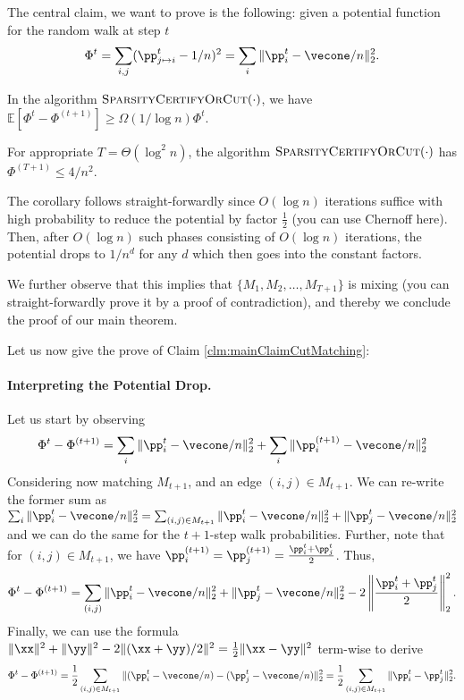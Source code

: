 The central claim, we want to prove is the following: given a potential function for the random walk at step $t$
\[
    \Phi^t = \sum_{i,j} (\pp_{j \mapsto i}^t - 1/n)^2 = \sum_{i} \|\pp_{i}^t - \vecone/n\|_2^2.
\]
\begin{claim}\label{clm:mainClaimCutMatching}
In the algorithm $\textsc{SparsityCertifyOrCut}(\cdot)$, we have $\mathbb{E}[\Phi^{t} - \Phi^{(t+1)}] \geq \Omega(1/\log n) \Phi^{t}$.
\end{claim}
\begin{corollary}
For appropriate $T = \Theta(\log^2 n)$, the algorithm $\textsc{SparsityCertifyOrCut}(\cdot)$ has $\Phi^{(T+1)} \leq 4/n^2$.
\end{corollary}

The corollary follows straight-forwardly since $O(\log n)$ iterations suffice with high probability to reduce the potential by factor $\frac{1}{2}$ (you can use Chernoff here). Then, after $O(\log n)$ such phases consisting of $O(\log n)$ iterations, the potential drops to $1/n^d$ for any $d$ which then goes into the constant factors.

We further observe that this implies that $\{M_1, M_2, \dots, M_{T+1}\}$ is mixing (you can straight-forwardly prove it by a proof of contradiction), and thereby we conclude the proof of our main theorem. 

Let us now give the prove of Claim \ref{clm:mainClaimCutMatching}: 

\paragraph{Interpreting the Potential Drop.} Let us start by observing 
\begin{align*}
     \Phi^{t} - \Phi^{(t+1)} = \sum_{i} \|\pp_{i}^t -\vecone/n\|_2^2 + \sum_{i} \|\pp_{i}^{(t+1)} -\vecone/n\|_2^2
\end{align*}
Considering now matching $M_{t+1}$,  and an edge $(i,j) \in M_{t+1}$. We can re-write the former sum as $\sum_{i} \|\pp_{i}^t -\vecone/n\|_2^2 = \sum_{(i,j) \in M_{t+1}} \|\pp_{i}^t -\vecone/n\|_2^2 + \|\pp_{j}^t -\vecone/n\|_2^2$ and we can do the same for the $t+1$-step walk probabilities. Further, note that for $(i,j) \in M_{t+1}$, we have $\pp_i^{(t+1)} = \pp_j^{(t+1)} = \frac{\pp_i^t+ \pp_j^t}{2}$. Thus,
\begin{align*}
     \Phi^{t} - \Phi^{(t+1)} = \sum_{(i,j)}  \|\pp_{i}^t -\vecone/n\|_2^2 + \|\pp_{j}^t -\vecone/n\|_2^2 - 2 \left\|\frac{\pp_i^t+ \pp_j^t}{2}\right\|_2^2.
\end{align*}
Finally, we can use the formula $\|\xx\|^2 + \|\yy\|^2 - 2 \|(\xx + \yy)/2\|^2 = \frac{1}{2} \| \xx - \yy\|^2$ term-wise to derive 
\begin{align*}
     \Phi^{t} - \Phi^{(t+1)} = \frac{1}{2}\sum_{(i,j) \in M_{t+1}} \|(\pp_{i}^t -\vecone/n) - (\pp_{j}^t -\vecone/n)\|_2^2 = \frac{1}{2}\sum_{(i,j) \in M_{t+1}} \|\pp_{i}^t - \pp_{j}^t \|_2^2.
\end{align*}

